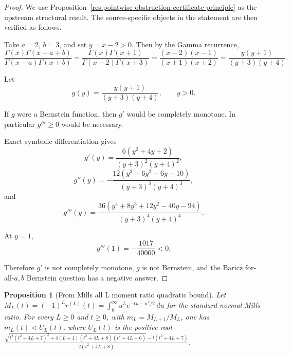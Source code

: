 \documentclass[11pt]{article}
\numberwithin{equation}{section}
\newtheorem{proposition}[theorem]{Proposition}
\theoremstyle{definition}
\theoremstyle{remark}
\newcommand{\1}{\mathbf 1}
\begin{document}
\begin{proof}
We use Proposition~\ref{res:pointwise-obstruction-certificate-principle} as the upstream structural result. The source-specific objects in the statement are then verified as follows.

Take \(a=2\), \(b=3\), and set \(y=x-2>0\). Then by the Gamma recurrence,
\[
\frac{\Gamma(x)\Gamma(x-a+b)}{\Gamma(x-a)\Gamma(x+b)}
=\frac{\Gamma(x)\Gamma(x+1)}{\Gamma(x-2)\Gamma(x+3)}
=\frac{(x-2)(x-1)}{(x+1)(x+2)}
=\frac{y(y+1)}{(y+3)(y+4)}.
\]

Let
\[
g(y)=\frac{y(y+1)}{(y+3)(y+4)},\qquad y>0.
\]

If \(g\) were a Bernstein function, then \(g'\) would be completely monotone. In particular \(g'''\ge0\) would be necessary.

Exact symbolic differentiation gives
\[
g'(y)=\frac{6(y^2+4y+2)}{(y+3)^2(y+4)^2},
\]
\[
g''(y)=
-\frac{12(y^3+6y^2+6y-10)}{(y+3)^3(y+4)^3},
\]
and
\[
g'''(y)=
\frac{36(y^4+8y^3+12y^2-40y-94)}{(y+3)^4(y+4)^4}.
\]

At \(y=1\),
\[
g'''(1)=-\frac{1017}{40000}<0.
\]

Therefore \(g'\) is not completely monotone, \(g\) is not Bernstein, and the Baricz for-all-\(a,b\) Bernstein question has a negative answer.
\end{proof}

\begin{proposition}[From Mills all L moment ratio quadratic bound]
\label{res:from-mills-all-l-moment-ratio-quadratic-bound}
Let \(M_L(t)=(-1)^L r^{(L)}(t)=\int_0^\infty u^L e^{-tu-u^2/2}\,du\) for the standard normal Mills ratio. For every \(L\ge0\) and \(t\ge0\), with \(m_L=M_{L+1}/M_L\), one has \(m_L(t)<U_L(t)\), where \(U_L(t)\) is the positive root \(\frac{\sqrt{t^2(t^2+4L+7)^2+4(L+1)(t^2+4L+8)(t^2+4L+6)}-t(t^2+4L+7)}{2(t^2+4L+8)}\).
\end{proposition}
\end{document}
